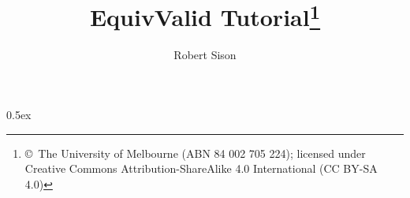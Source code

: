 \documentclass[11pt,a4paper]{article}
\begin{document}
\title{EquivValid Tutorial\thanks{\copyright~The University of Melbourne (ABN 84 002 705 224); licensed under Creative Commons Attribution-ShareAlike 4.0 International (CC BY-SA 4.0)}}
\renewcommand\footnotemark{}
\author{Robert Sison}
\maketitle

\tableofcontents

\parindent 0pt\parskip 0.5ex





\end{document}
